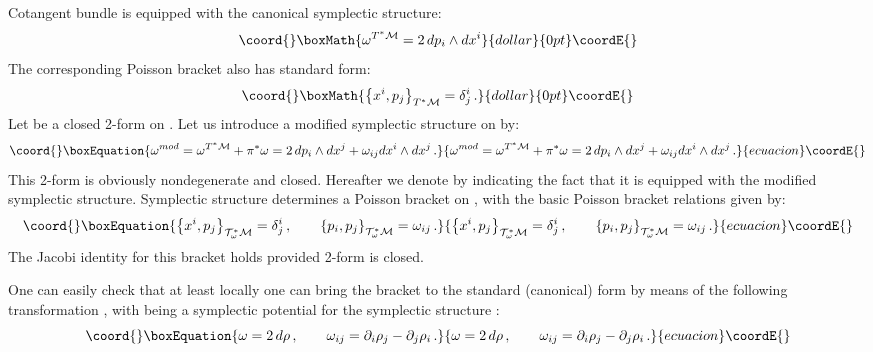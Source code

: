 \documentclass[a4paper,11pt]{amsart}
\numberwithin{thm}{section} %
\numberwithin{equation}{section} %
\numberwithin{figure}{section} %
\providecommand{\pb}[2]{\left\{{}#1{},{}#2{}\right\}}
\renewcommand{\:}{{\rm\, :\,}}
\def\d{\partial}
\def\mod{{\mathcal T}^*_\omega}
\def\manM{{\mathcal M}}
\begin{document}
Cotangent bundle \myHighlight{$T^*\manM$}\coordHE{} is equipped with the canonical symplectic
structure:
$$\coord{}\boxMath{
\omega^{T^*\manM}=2\,dp_i \wedge dx^i
}{dollar}{0pt}\coordE{}$$
The corresponding Poisson bracket also has standard
form:
$$\coord{}\boxMath{
  \pb{x^i}{p_j}_{T^*\manM}=\delta^i_j\,.
}{dollar}{0pt}\coordE{}$$
Let \coordHE{} be a closed 2-form on
\myHighlight{$\manM$}\coordHE{}.  Let us introduce a modified symplectic structure on
\myHighlight{$T^*\manM$}\coordHE{} by:
\begin{equation}\coord{}\boxEquation{
  \label{eq:mod-symplectic}
\omega^{mod}=
\omega^{T^*\manM}+\pi^* \omega=2\,dp_i \wedge dx^j + \omega_{ij} dx^i
\wedge dx^j\,.
}{
  \omega^{mod}=
\omega^{T^*\manM}+\pi^* \omega=2\,dp_i \wedge dx^j + \omega_{ij} dx^i
\wedge dx^j\,.
}{ecuacion}\coordE{}\end{equation}
This 2-form is obviously nondegenerate and closed.
Hereafter we denote \myHighlight{$T^*\manM$}\coordHE{} by \myHighlight{$\mod\manM$}\coordHE{} indicating the fact that
it is equipped with the modified symplectic structure.
Symplectic structure \coordHE{} determines a Poisson bracket
on \myHighlight{$\mod\manM$}\coordHE{}, with the basic Poisson bracket relations given by:
\begin{equation}\coord{}\boxEquation{
  \label{eq:mod-PB}
\pb{x^i}{p_j}_{\mod\manM}=\delta^i_j\,, \qquad
\pb{p_i}{p_j}_{\mod\manM}=\omega_{ij}\,.
}{
  \pb{x^i}{p_j}_{\mod\manM}=\delta^i_j\,, \qquad
\pb{p_i}{p_j}_{\mod\manM}=\omega_{ij}\,.
}{ecuacion}\coordE{}\end{equation}
The Jacobi identity for this bracket holds provided 2-form
\myHighlight{$\omega$}\coordHE{} is closed.

One can easily check that at least locally one can bring the bracket
to the standard (canonical) form by means of the following transformation
\coordHE{}, with \coordHE{} being a symplectic
potential for the symplectic structure \myHighlight{$\omega$}\coordHE{}:
\begin{equation}\coord{}\boxEquation{
  \omega=2\, d\rho\,, \qquad \omega_{ij}=\d_i \rho_j -\d_j\rho_i\,.
}{
  \omega=2\, d\rho\,, \qquad \omega_{ij}=\d_i \rho_j -\d_j\rho_i\,.
}{ecuacion}\coordE{}\end{equation}
\end{document}
